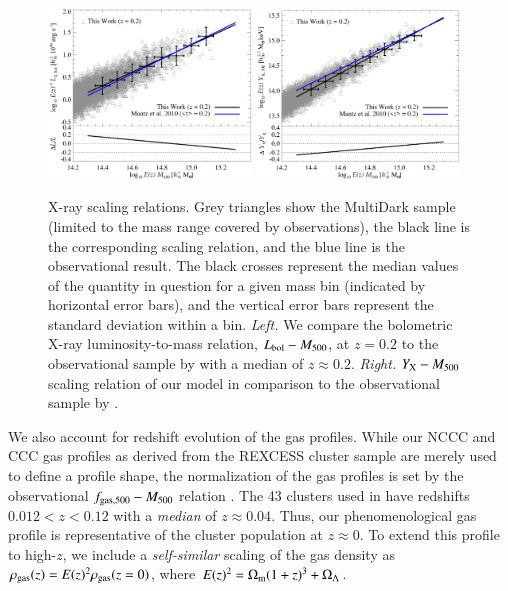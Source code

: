 \documentclass[useAMS,usenatbib]{mn2e}
\begin{document}
\begin{figure} 
\centering
\includegraphics[width=0.48\textwidth]{figures/lx_m.eps}
\includegraphics[width=0.48\textwidth]{figures/yx_m.eps}
\caption{X-ray scaling relations. Grey triangles show the MultiDark
  sample (limited to the mass range covered by observations), the black line is
  the corresponding scaling relation, and the blue line is the
  observational result. The black crosses represent the median values of the
  quantity in question for a given mass bin (indicated by horizontal error
  bars), and the vertical error bars represent the standard deviation within a
  bin.  \emph{Left.} We compare the bolometric X-ray luminosity-to-mass
  relation, $L_{{\mathrm{bol}}}-M_{500}$, at $z=0.2$ to the observational sample by
  \protect\cite{2010MNRAS.406.1773M} with a median of $z \approx 0.2$. 
  \emph{Right.} $Y_{{\mathrm{X}}}-M_{500}$ scaling relation of our model in comparison to the
  observational sample by \protect\cite{2010MNRAS.406.1773M}.} 
\label{fig:X_LM}
\end{figure}

We also account for redshift evolution of the gas profiles. While our NCCC and
CCC gas profiles as derived from the REXCESS cluster sample are merely used to
define a profile shape, the normalization of the gas profiles is set by the
observational $f_{{\mathrm{gas}},500}-M_{500}$ relation \citep{2009ApJ...693.1142S}.
The 43 clusters used in \cite{2009ApJ...693.1142S} have redshifts $0.012 < z <
0.12$ with a \emph{median} of $z \approx 0.04$. Thus, our phenomenological gas
profile is representative of the cluster population at $z\approx0$. To extend this
profile to high-$z$, we include a \emph{self-similar} scaling of the gas density
as $\rho_{{\mathrm{gas}}}(z) = E(z)^{2} \rho_{{\mathrm{gas}}}(z=0)$, where $E(z)^{2} =
\Omega_{{\mathrm{m}}} (1+z)^{3} + \Omega_{{\Lambda}}$.
\end{document}

